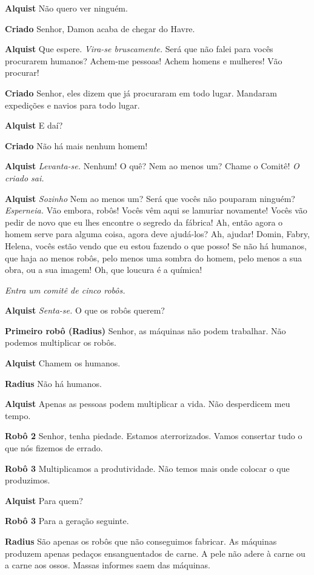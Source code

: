 \textbf{Alquist} Não quero ver ninguém.

\textbf{Criado} Senhor, Damon acaba de chegar do Havre.

\textbf{Alquist} Que espere. \emph{Vira-se bruscamente.} Será que não falei para vocês
procurarem humanos? Achem-me pessoas! Achem homens e mulheres! Vão procurar!

\textbf{Criado} Senhor, eles dizem que já procuraram em todo lugar. Mandaram expedições
e navios para todo lugar.

\textbf{Alquist} E daí?

\textbf{Criado} Não há mais nenhum homem!

\textbf{Alquist} \emph{Levanta-se.} Nenhum! O quê? Nem ao menos um? Chame o Comitê!
\emph{O criado sai.}

\textbf{Alquist} \emph{Sozinho} Nem ao menos um? Será que vocês não pouparam ninguém?
\emph{Esperneia.} Vão embora, robôs! Vocês vêm aqui se lamuriar novamente! Vocês vão
pedir de novo que eu lhes encontre o segredo da fábrica! Ah, então agora o homem
serve para alguma coisa, agora deve ajudá-los? Ah, ajudar! Domin, Fabry,
Helena, vocês estão vendo que eu estou fazendo o que posso! Se não há humanos,
que haja ao menos robôs, pelo menos uma sombra do homem, pelo menos a sua obra, ou
a sua imagem! Oh, que loucura é a química!

\emph{Entra um comitê de cinco robôs.}

\textbf{Alquist} \emph{Senta-se.} O que os robôs querem?

\textbf{Primeiro robô (Radius)} Senhor, as máquinas não podem trabalhar. Não podemos
multiplicar os robôs.

\textbf{Alquist} Chamem os humanos.

\textbf{Radius} Não há humanos.

\textbf{Alquist} Apenas as pessoas podem multiplicar a vida. Não desperdicem  meu tempo.

\textbf{Robô 2} Senhor, tenha piedade. Estamos aterrorizados. Vamos consertar tudo o
que nós fizemos de errado.

\textbf{Robô 3} Multiplicamos a produtividade. Não temos mais onde colocar o que
produzimos.

\textbf{Alquist} Para quem?

\textbf{Robô 3} Para a geração seguinte.

\textbf{Radius} São apenas os robôs que não conseguimos fabricar. As máquinas
produzem apenas pedaços ensanguentados de carne. A pele não adere à carne ou a
carne aos ossos. Massas informes saem das máquinas.

